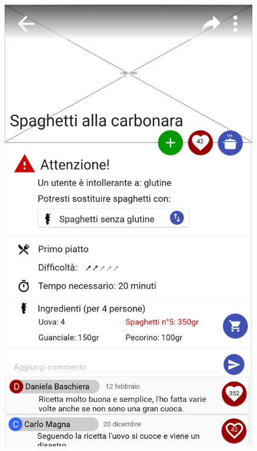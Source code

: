 \begin{figure}[H]
	
	\begin{minipage}{.49\textwidth}
		\includegraphics[width=\textwidth]{img/wireframe/presentazione_ricetta_allergia_cambio_ingrediente_aggiungi_ricetta.png}
	\end{minipage}
	\begin{minipage}{.49\textwidth}

\end{minipage}
\end{figure}
